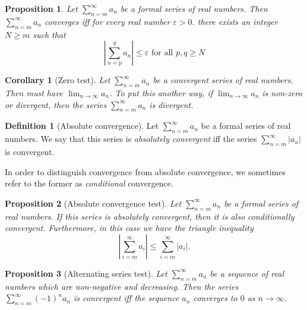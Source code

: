 \documentclass[
]{book}
\newtheorem{corollary}{Corollary}[chapter]
\newtheorem{proposition}{Proposition}[chapter]
\theoremstyle{definition}
\newtheorem{definition}{Definition}[chapter]
\theoremstyle{definition}
\theoremstyle{definition}
\theoremstyle{definition}
\theoremstyle{remark}
\begin{document}
\begin{proposition}
Let \(\sum_{n=m}^{\infty}a_n\) be a formal series of real numbers. Then \(\sum_{n=m}^{\infty}a_n\) converges iff for every real number \(\varepsilon>0\). there exists an integer \(N\geq m\) such that
\[
\left|
\sum_{n=p}^{q}a_n\right|\leq \varepsilon \text{ for all }p,q\geq N
\]
\end{proposition}

\begin{corollary}[Zero test]
Let \(\sum_{n=m}^{\infty}a_n\) be a convergent series of real numbers. Then must have \(\lim_{n\to\infty}a_n\). To put this another way, if \(\lim_{n\to\infty}a_n\) is non-zero or divergent, then the series \(\sum_{n=m}^{\infty}a_n\) is divergent.
\end{corollary}

\begin{definition}[Absolute convergence]
Let \(\sum_{n=m}^{\infty}a_n\) be a formal series of real numbers. We say that this series is \emph{absolutely convergent} iff the series \(\sum_{n=m}^{\infty}|a_n|\) is convergent.
\end{definition}

In order to distinguish convergence from absolute convergence, we sometimes refer to the former as \emph{conditional} convergence.

\begin{proposition}[Absolute convergence test]
Let \(\sum_{n=m}^{\infty}a_n\) be a formal series of real numbers. If this series is absolutely convergent, then it is also conditionally convergent. Furthermore, in this case we have the triangle inequality
\[
\left|\sum_{i=m}^{\infty}a_i\right|\leq\sum_{i=m}^{\infty}|a_i|.
\]
\end{proposition}

\begin{proposition}[Alternating series test]
Let \(\sum_{n=m}^{\infty}a_n\) be a sequence of real numbers which are non-negative and decreasing. Then the series \(\sum_{n=m}^{\infty}(-1)^na_n\) is convergent iff the sequence \(a_n\) converges to \(0\) as \(n\to\infty\).
\end{proposition}
\end{document}
